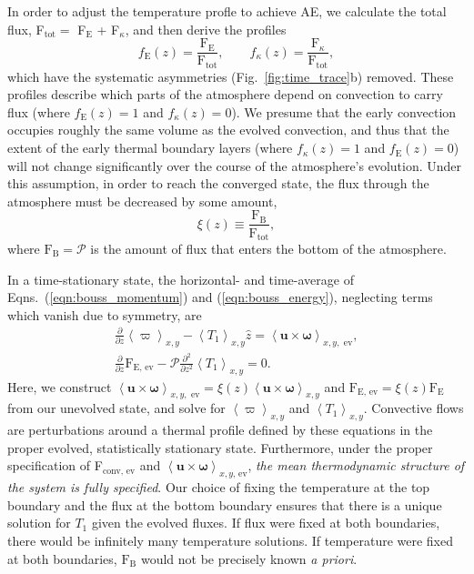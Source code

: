 \documentclass[aps, pre, onecolumn, nofootinbib, notitlepage, groupedaddress, amsfonts, amssymb, amsmath, longbibliography]{revtex4-1}
\newcommand{\angles}[1]{\ensuremath{\left\langle #1 \right\rangle}}
\begin{document}
In order to adjust the temperature profle to achieve AE, we calculate the total flux,
F$_{\text{tot}} =$ F$_{\text{E}}$ + F$_{\kappa}$, and then derive the profiles
\begin{equation}
f_{\text{E}}(z) = \frac{\text{F}_{\text{E}}}{\text{F}_{\text{tot}}},\qquad
f_{\kappa}(z) = \frac{\text{F}_{\kappa}}{\text{F}_{\text{tot}}},
\label{eqn:bvp_ratios}
\end{equation}
which have the systematic asymmetries (Fig.~\ref{fig:time_trace}b) removed. These profiles describe which
parts of the atmosphere depend on convection to carry flux (where $f_{\text{E}}(z) = 1$
and $f_{\kappa}(z) = 0$).
We presume that the early convection occupies roughly the same volume as the evolved
convection, and thus that the extent of the early thermal boundary layers 
(where $f_{\kappa}(z) = 1$ and $f_{\text{E}}(z) = 0$) 
will not change significantly over the course of the atmosphere's evolution.
Under this assumption, in order to reach the converged state, 
the flux through the atmosphere must be decreased by some amount,
\begin{equation}
\xi(z) \equiv \frac{\text{F}_{\text{B}}}{\text{F}_{\text{tot}}},
\label{eqn:xi}
\end{equation}
where $\text{F}_{\text{B}} = \mathcal{P}$ is the amount of flux that enters the
bottom of the atmosphere.

In a time-stationary state, the horizontal- and time-average of
Eqns.~(\ref{eqn:bouss_momentum}) and (\ref{eqn:bouss_energy}), neglecting terms which
vanish due to symmetry, are
\begin{gather}
\frac{\partial}{\partial z}\angles{\varpi}_{x,y} - \angles{T_1}_{x,y}\hat{z} = \angles{\bm{u}\times\bm{\omega}}_{x,y, \text{ ev}},
	\label{eqn:bouss_BVP_momentum}
\\
\frac{\partial}{\partial z}\text{F}_{\text{E, ev}} - \mathcal{P}\frac{\partial^2}{\partial z^2} \angles{T_1}_{x,y} = 0.
	\label{eqn:bouss_BVP_energy}
\end{gather}
Here, we construct $\angles{\bm{u}\times\bm{\omega}}_{x, y,\text{ ev}} =
\xi(z) \angles{\bm{u}\times\bm{\omega}}_{x, y}$ and $\text{F}_{\text{E, ev}} = \xi(z) \text{F}_{\text{E}}$
from our unevolved state, and solve for $\angles{\varpi}_{x,y}$ and $\angles{T_1}_{x,y}$.
Convective flows
are perturbations around a thermal profile defined by these equations in the proper evolved, 
statistically stationary state. Furthermore, under the proper specification of
F$_{\text{conv, ev}}$ and $\angles{\bm{u}\times\bm{\omega}}_{x,y\text{, ev}}$,
\emph{the mean thermodynamic structure of the system is fully specified}. 
Our choice of fixing the temperature at the top boundary and the flux at the bottom
boundary ensures that there is a unique solution for $T_1$ given the evolved
fluxes. If flux were fixed at both boundaries, there would be infinitely many
temperature solutions. If temperature were fixed at both boundaries, 
$\text{F}_{\text{B}}$ would not be precisely known \emph{a priori}.
\end{document}
